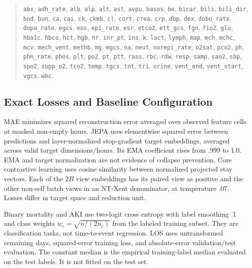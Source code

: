 \begin{quote}\footnotesize
\texttt{abx}, \texttt{adh\_rate}, \texttt{alb}, \texttt{alp}, \texttt{alt}, \texttt{ast}, \texttt{avpu}, \texttt{basos}, \texttt{be}, \texttt{bicar}, \texttt{bili}, \texttt{bili\_dir}, \texttt{bnd}, \texttt{bun}, \texttt{ca}, \texttt{cai}, \texttt{ck}, \texttt{ckmb}, \texttt{cl}, \texttt{cort}, \texttt{crea}, \texttt{crp}, \texttt{dbp}, \texttt{dex}, \texttt{dobu\_rate}, \texttt{dopa\_rate}, \texttt{egcs}, \texttt{eos}, \texttt{epi\_rate}, \texttt{esr}, \texttt{etco2}, \texttt{ett\_gcs}, \texttt{fgn}, \texttt{fio2}, \texttt{glu}, \texttt{hba1c}, \texttt{hbco}, \texttt{hct}, \texttt{hgb}, \texttt{hr}, \texttt{inr\_pt}, \texttt{ins}, \texttt{k}, \texttt{lact}, \texttt{lymph}, \texttt{map}, \texttt{mch}, \texttt{mchc}, \texttt{mcv}, \texttt{mech\_vent}, \texttt{methb}, \texttt{mg}, \texttt{mgcs}, \texttt{na}, \texttt{neut}, \texttt{norepi\_rate}, \texttt{o2sat}, \texttt{pco2}, \texttt{ph}, \texttt{phn\_rate}, \texttt{phos}, \texttt{plt}, \texttt{po2}, \texttt{pt}, \texttt{ptt}, \texttt{rass}, \texttt{rbc}, \texttt{rdw}, \texttt{resp}, \texttt{samp}, \texttt{sao2}, \texttt{sbp}, \texttt{spo2}, \texttt{supp\_o2}, \texttt{tco2}, \texttt{temp}, \texttt{tgcs}, \texttt{tnt}, \texttt{tri}, \texttt{urine}, \texttt{vent\_end}, \texttt{vent\_start}, \texttt{vgcs}, \texttt{wbc}.
\end{quote}

\subsection{Exact Losses and Baseline Configuration}

MAE minimizes squared reconstruction error averaged over observed feature cells at masked non-empty hours. JEPA uses elementwise squared error between predictions and layer-normalized stop-gradient target embeddings, averaged across valid target dimensions/hours. Its EMA coefficient rises from .999 to 1.0. EMA and target normalization are not evidence of collapse prevention. Core contrastive learning uses cosine similarity between normalized projected stay vectors. Each of the $2B$ view embeddings has its paired view as positive and the other non-self batch views in an NT-Xent denominator, at temperature .07. Losses differ in target space and reduction unit.

Binary mortality and AKI use two-logit cross entropy with label smoothing .1 and class weights $w_c=\sqrt{n/(2n_c)}$ from the labeled training subset. They are classification tasks, not time-to-event regression. LOS uses untransformed remaining days, squared-error training loss, and absolute-error validation/test evaluation. The constant median is the empirical training-label median evaluated on the test labels. It is not fitted on the test set.

